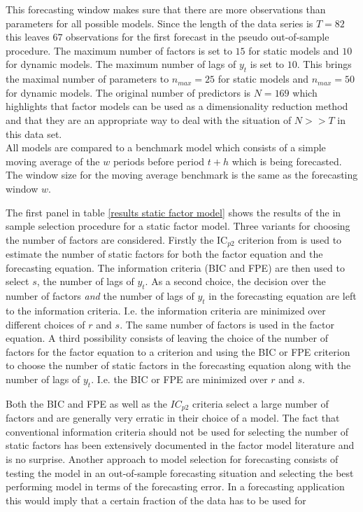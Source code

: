 \documentclass[12pt]{article}
\begin{document}
This forecasting window makes sure that there are more observations than parameters for all possible models. Since the length of the data series is $T=82$ this leaves $67$ observations for the first forecast in the pseudo out-of-sample procedure. The maximum number of factors is set to $15$ for static models and $10$ for dynamic models. The maximum number of lags of $y_t$ is set to $10$. This brings the maximal number of parameters to $n_{max} = 25$ for static models and $n_{max} = 50$ for dynamic models. The original number of predictors is $N = 169$ which highlights that factor models can be used as a dimensionality reduction method and that they are  an appropriate way to deal with the situation of $N>>T$ in this data set.
\\

All models are compared to a benchmark model which consists of a simple moving average of the $w$ periods before period $t+h$ which is being forecasted. The window size for the moving average benchmark is the same as the forecasting window $w$. 

The first panel in table \ref{results static factor model} shows the results of the in sample selection procedure for a static factor model. Three variants for choosing the number of factors are considered. Firstly the IC$_{p2}$ criterion from \citet{bai2002determining} is used to estimate the number of static factors for both the factor equation and the forecasting equation. The information criteria (BIC and FPE) are then used to select $s$, the number of lags of $y_t$.
As a second choice, the decision over the number of factors \textit{and} the number of lags of $y_t$ in the forecasting equation are left to the information criteria. I.e. the information criteria are minimized over different choices of $r$ and $s$. The same number of factors is used in the factor equation.
A third possibility consists of leaving the choice of the number of factors for the factor equation to a \citet{bai2002determining} criterion and using the BIC or FPE criterion to choose the number of static factors in the forecasting equation along with the number of lags of $y_t$. I.e. the BIC or FPE are minimized over $r$ and $s$.

Both the BIC and FPE as well as the $IC_{p2}$ criteria select a large number of factors and are generally very erratic in their choice of a model. The fact that conventional information criteria should not be used for selecting the number of static factors has been extensively documented in the factor model literature and is no surprise. Another approach to model selection for forecasting consists of testing the model in an out-of-sample forecasting situation and selecting the best performing model in terms of the forecasting error. In a forecasting application this would imply that a certain fraction of the data has to be used for 
\end{document}
